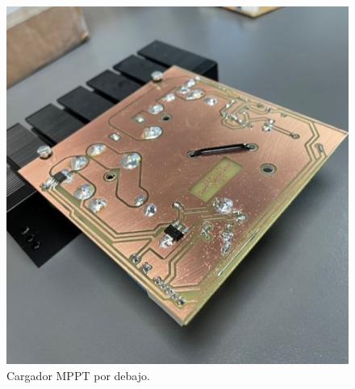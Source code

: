 \begin{figure}[H]
    \centering
    \includegraphics[width=0.65\linewidth]{informes/IMG_8866.jpg}
    \caption{Cargador MPPT por debajo.}
\end{figure}

